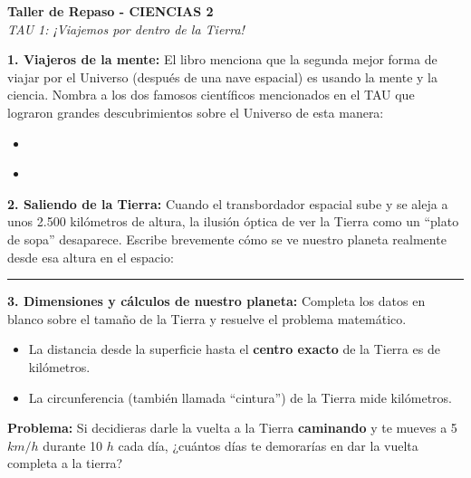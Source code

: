 \documentclass[12pt, letterpaper]{article}
\begin{document}
	
	\begin{center} 
		\textbf{Taller de Repaso - CIENCIAS 2}\\[0.1cm] 
		\textit{TAU 1: ¡Viajemos por dentro de la Tierra!} 
	\end{center}
	
	
	\noindent \textbf{1. Viajeros de la mente:} El libro menciona que la segunda mejor forma de viajar por el Universo (después de una nave espacial) es usando la mente y la ciencia. Nombra a los dos famosos científicos mencionados en el TAU que lograron grandes descubrimientos sobre el Universo de esta manera:
	\vspace{0.2cm}
	\begin{itemize}[itemsep=0.4cm, label={--}]
		\item \underline{\hspace{8cm}}
		\item \underline{\hspace{8cm}}
	\end{itemize}
	
	\vspace{0.3cm}
	
	\noindent \textbf{2. Saliendo de la Tierra:} Cuando el transbordador espacial sube y se aleja a unos 2.500 kilómetros de altura, la ilusión óptica de ver la Tierra como un ``plato de sopa'' desaparece. Escribe brevemente cómo se ve nuestro planeta realmente desde esa altura en el espacio:
	\vspace{0.8cm}
	\noindent \rule{\textwidth}{0.4pt}
	\vspace{0.4cm}
	
	\noindent \textbf{3. Dimensiones y cálculos de nuestro planeta:} Completa los datos en blanco sobre el tamaño de la Tierra y resuelve el problema matemático.
	\vspace{0.2cm}
	\begin{itemize}[itemsep=0.4cm, label={$\bullet$}]
		\item La distancia desde la superficie hasta el \textbf{centro exacto} de la Tierra es de \underline{\hspace{2.5cm}} kilómetros.
		\item La circunferencia (también llamada ``cintura'') de la Tierra mide \underline{\hspace{2.5cm}} kilómetros.
	\end{itemize}
	\vspace{0.2cm}
	\noindent \textbf{Problema:} Si decidieras darle la vuelta a la Tierra \textbf{caminando} y te mueves a 5 $km/h$ durante 10 $h$ cada día, ¿cuántos días te demorarías en dar la vuelta completa a la tierra?
	\vspace{0.1cm}
\end{document}
